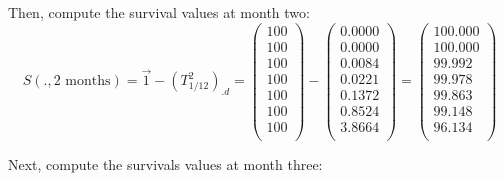 \documentclass[a4paper,12pt,final]{article}
\begin{document}
Then, compute the survival values at month two:
\begin{displaymath}
S(.,2 \textrm{ months}) = \vec{1} - (T_{1/12}^2)_{.d} = 
\left( 
\begin{array}{c}
 100 \\
 100 \\
 100 \\
 100 \\
 100 \\
 100 \\
 100 \\
\end{array}
\right)
 - 
\left( 
\begin{array}{c}
 0.0000 \\
 0.0000 \\
 0.0084 \\
 0.0221 \\
 0.1372 \\
 0.8524 \\
 3.8664 \\
\end{array}
\right)
=
\left( 
\begin{array}{c}
 100.000 \\
 100.000 \\
  99.992 \\
  99.978 \\
  99.863 \\
  99.148 \\
  96.134 \\
\end{array}
\right)
\end{displaymath}

Next, compute the survivals values at month three:
\end{document}
